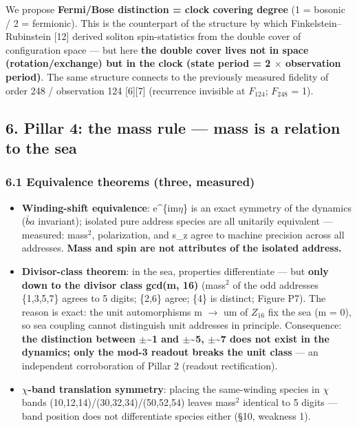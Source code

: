 \documentclass[
]{article}
\providecommand{\tightlist}{%
  \setlength{\itemsep}{0pt}\setlength{\parskip}{0pt}}
\begin{document}
We propose \textbf{Fermi/Bose distinction = clock covering degree} (1 =
bosonic / 2 = fermionic). This is the counterpart of the structure by
which Finkelstein--Rubinstein {[}12{]} derived soliton spin-statistics
from the double cover of configuration space --- but here \textbf{the
double cover lives not in space (rotation/exchange) but in the clock
(state period = 2 \(\times\) observation period)}. The same structure
connects to the previously measured fidelity of order 248 / observation
124 {[}6{]}{[}7{]} (recurrence invisible at \(F_{124}\); \(F_{248}\) =
1).

\subsection{6. Pillar 4: the mass rule --- mass is a relation to the
sea}\label{pillar-4-the-mass-rule-mass-is-a-relation-to-the-sea}

\subsubsection{6.1 Equivalence theorems (three,
measured)}\label{equivalence-theorems-three-measured}

\begin{itemize}
\tightlist
\item
  \textbf{Winding-shift equivalence}: e\^{}\{im\(\eta\)\} is an exact
  symmetry of the dynamics (\(\bar b a\) invariant); isolated pure
  address species are all unitarily equivalent --- measured: mass\(^2\),
  polarization, and s\_z agree to machine precision across all
  addresses. \textbf{Mass and spin are not attributes of the isolated
  address.}
\item
  \textbf{Divisor-class theorem}: in the sea, properties differentiate
  --- but \textbf{only down to the divisor class gcd(m, 16)} (mass\(^2\)
  of the odd addresses \{1,3,5,7\} agrees to 5 digits; \{2,6\} agree;
  \{4\} is distinct; Figure P7). The reason is exact: the unit
  automorphisms m \(\to\) um of \(Z_{16}\) fix the sea (m = 0), so sea
  coupling cannot distinguish unit addresses in principle. Consequence:
  \textbf{the distinction between \(\pm\)\textasciitilde1 and
  \(\pm\)\textasciitilde5, \(\pm\)\textasciitilde7 does not exist in the
  dynamics; only the mod-3 readout breaks the unit class} --- an
  independent corroboration of Pillar 2 (readout rectification).
\item
  \textbf{\(\chi\)-band translation symmetry}: placing the same-winding
  species in \(\chi\) bands (10,12,14)/(30,32,34)/(50,52,54) leaves
  mass\(^2\) identical to 5 digits --- band position does not
  differentiate species either (§10, weakness 1).
\end{itemize}
\end{document}
